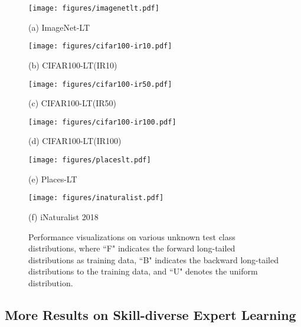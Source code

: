 \documentclass{article}
\begin{document}
\begin{figure*}  
  \begin{minipage}{0.48\linewidth}
   \centerline{\texttt{[image: figures/imagenetlt.pdf]}}
   \centerline{\small{(a) ImageNet-LT}}
  \end{minipage}
  \hfill
\begin{minipage}{0.48\linewidth}
   \centerline{\texttt{[image: figures/cifar100-ir10.pdf]}}
   \centerline{\small{(b) CIFAR100-LT(IR10)}}
  \end{minipage}
  \vfill
  \begin{minipage}{0.48\linewidth}
   \centerline{\texttt{[image: figures/cifar100-ir50.pdf]}}
   \centerline{\small{(c) CIFAR100-LT(IR50)}}
  \end{minipage}
  \hfill    
  \begin{minipage}{0.48\linewidth}
   \centerline{\texttt{[image: figures/cifar100-ir100.pdf]}}
   \centerline{\small{(d) CIFAR100-LT(IR100)}}
  \end{minipage}
  \vfill
  \begin{minipage}{0.48\linewidth}
   \centerline{\texttt{[image: figures/placeslt.pdf]}} 
   \centerline{\small{(e) Places-LT}}
  \end{minipage}
    \hfill    
  \begin{minipage}{0.48\linewidth}
   \centerline{\texttt{[image: figures/inaturalist.pdf]}}
   \centerline{\small{(f) iNaturalist 2018}}
  \end{minipage}  
 \caption{Performance visualizations  on various unknown test class distributions, where ``F" indicates the forward long-tailed distributions as training data, ``B" indicates the backward long-tailed distributions to the training data, and ``U" denotes the uniform distribution.}\label{visualizations}  
\end{figure*}


\clearpage
\subsection{More Results on Skill-diverse Expert Learning}
\label{cls_expert_learning_supp}
\end{document}
